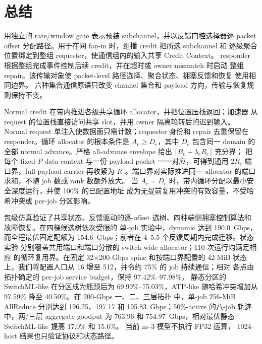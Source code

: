 \chapter{总结}
\label{chap:conclusion}

\sysname 用独立的 rate/window gate 表示预装 subchannel，并以反馈门控选择器逐
packet offset 分配路径。用于在网 fan-in 时，组播 credit 把所选 subchannel 和
逐级聚合位置绑定到整组 requester，使通信组内的输入共享 Credit Context。
responder 根据整组完成事件控制后续 credit，并在超时或 owner mismatch 时启动
整组 repair。该传输对象使 packet-level 路径选择、聚合状态、拥塞反馈和恢复
使用相同边界。
六种集合通信原语只改变 channel 集合和 payload 方向，传输与恢复规则保持不变。

Normal credit 在带内推进各级共享循环 allocator，并把位置压栈返回；加速器
从 request 的位置栈直接访问共享 slot，并用 owner 隔离轮转后的迟到输入。
Normal request 单注入使数据面只需计数；requester 身份和 repair 去重保留在
responder。循环 allocator 的根本条件是 $A_e\geq D_e$，其中 $D_e$ 包含同一
domain 的全部 normal advance。严格 all-advance envelope 给出
$\lceil B_e+\lambda_eR_e\rceil$ 充分界；
把每个 fixed-$P$ data context 与一份 payload packet 一一对应，可得到通用
$2R_e$ 端口界，full-payload carrier 再收紧为 $R_e$。端口界对实际推进同一 allocator 的端口
求和，不随 job 数或 rank 数额外放大。
当 $A_e=D_e$ 时，带内循环分配以最小安全深度运行，并使 100\% 的已配置地址
成为无提前复用冲突的有效容量，不受哈希冲突或 per-job 分区影响。

包级仿真验证了共享状态、反馈驱动的逐-offset 选树、四种端侧拥塞控制算法和
故障恢复。在四棵候选树依次受限的
单-job 实验中，dynamic 达到 190.0~Gbps，而全程最优固定配额为
154.6~Gbps；前者在 4--5.5 个反馈周期内完成迁移。状态实验
分别覆盖共用端口和端口分散的 switch-wide allocator；110 次运行均满足相应
的循环复用界。在固定 32$\times$200-Gbps spine 和按端口界配置的 42-MiB
状态上，我们将配置人口从 16 增至 512，并令约 75\% 的 job 持续通信；相对
各点由拓扑确定的 per-job service budget，\sysname 保持 97.42\%--97.98\%，
静态分区的 SwitchML-like 在分区成为瓶颈后为 69.99\%--75.03\%，ATP-like
随哈希冲突增加从 97.59\% 降至 40.50\%。在 200-Gbps 一、二、三层拓扑
中，单-job 256-MiB AllReduce 分别达到 196.25、197.17 和
195.83~Gbps；50\%-active 的八-job 轨迹中，两/三层 aggregate goodput
为 763.96 和 754.97~Gbps，相对最优静态 SwitchML-like 提高
17.0\% 和 15.6\%。
当前 ns-3 模型不执行 FP32 运算，
1024-host 结果也只验证协议和状态路径。

